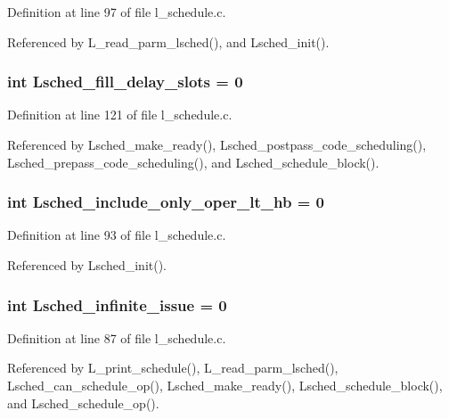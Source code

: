Definition at line 97 of file l\_\-schedule.c.

Referenced by L\_\-read\_\-parm\_\-lsched(), and Lsched\_\-init().
\subsubsection{\setlength{\rightskip}{0pt plus 5cm}int \bf{Lsched\_\-fill\_\-delay\_\-slots} = 0}\label{l__schedule_8c_6d53c903b4fd077ed1a02626dbebfda0}




Definition at line 121 of file l\_\-schedule.c.

Referenced by Lsched\_\-make\_\-ready(), Lsched\_\-postpass\_\-code\_\-scheduling(), Lsched\_\-prepass\_\-code\_\-scheduling(), and Lsched\_\-schedule\_\-block().
\subsubsection{\setlength{\rightskip}{0pt plus 5cm}int \bf{Lsched\_\-include\_\-only\_\-oper\_\-lt\_\-hb} = 0}\label{l__schedule_8c_20a06bed1bdca8cd03cffb1cbe5b588b}




Definition at line 93 of file l\_\-schedule.c.

Referenced by Lsched\_\-init().
\subsubsection{\setlength{\rightskip}{0pt plus 5cm}int \bf{Lsched\_\-infinite\_\-issue} = 0}\label{l__schedule_8c_a41d94228aa003482c3c8da8841c420f}




Definition at line 87 of file l\_\-schedule.c.

Referenced by L\_\-print\_\-schedule(), L\_\-read\_\-parm\_\-lsched(), Lsched\_\-can\_\-schedule\_\-op(), Lsched\_\-make\_\-ready(), Lsched\_\-schedule\_\-block(), and Lsched\_\-schedule\_\-op().
